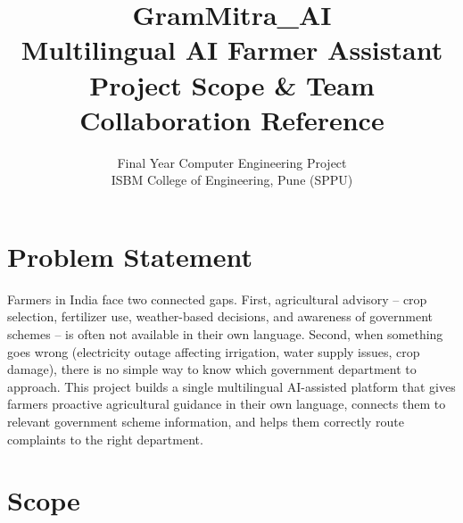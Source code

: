\documentclass[11pt,a4paper]{article}
\title{\textbf{GramMitra\_AI \\ \large Multilingual AI Farmer Assistant \\ \large Project Scope \& Team Collaboration Reference}}
\author{Final Year Computer Engineering Project \\ ISBM College of Engineering, Pune (SPPU)}
\date{}
\begin{document}
\maketitle

\section{Problem Statement}
Farmers in India face two connected gaps. First, agricultural advisory --
crop selection, fertilizer use, weather-based decisions, and awareness of
government schemes -- is often not available in their own language.
Second, when something goes wrong (electricity outage affecting
irrigation, water supply issues, crop damage), there is no simple way to
know which government department to approach. This project builds a
single multilingual AI-assisted platform that gives farmers proactive
agricultural guidance in their own language, connects them to relevant
government scheme information, and helps them correctly route complaints
to the right department.

\section{Scope}
\end{document}
